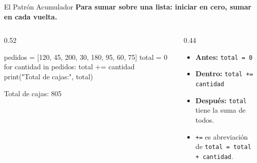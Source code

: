 \documentclass[aspectratio=169, 11pt]{beamer}
\begin{document}
\begin{frame}[fragile,shrink=30]{El Patrón Acumulador}
  \vspace{-6pt}
  {\small\color{arcaDark}\bfseries
    Para sumar sobre una lista:
    iniciar en cero, sumar en cada vuelta.}

  \vspace{4pt}
  \begin{columns}[T]
    \begin{column}{0.52\textwidth}
      \begin{pyblock}
pedidos = [120, 45, 200, 30, 180, 95, 60, 75]
total = 0
for cantidad in pedidos:
    total += cantidad
print("Total de cajas:", total)
      \end{pyblock}
      \vspace{-2pt}
      \begin{outputblock}
Total de cajas: 805
      \end{outputblock}
    \end{column}

    \begin{column}{0.44\textwidth}
      {\footnotesize\color{textMuted}
      \begin{itemize}\setlength{\itemsep}{5pt}
        \item[{\color{arcaRed}\scriptsize\faArrowRight}]
          \textbf{Antes:} \texttt{total = 0}
        \item[{\color{arcaRed}\scriptsize\faArrowRight}]
          \textbf{Dentro:} \texttt{total += cantidad}
        \item[{\color{arcaRed}\scriptsize\faArrowRight}]
          \textbf{Después:} \texttt{total} tiene
          la suma de todos.
        \item[{\color{arcaRed}\scriptsize\faLightbulb}]
          \texttt{+=} es abreviación de
          \texttt{total = total + cantidad}.
      \end{itemize}
      }
    \end{column}
  \end{columns}
\end{frame}
\end{document}

